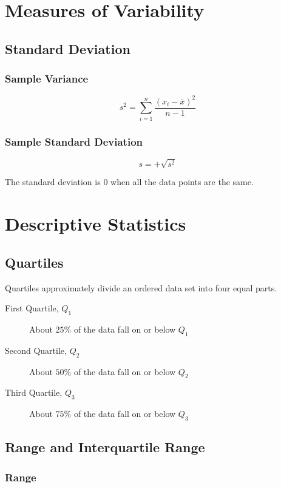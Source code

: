 \documentclass{book}
\begin{document}
\section{Measures of Variability}

\subsection{Standard Deviation}

\subsubsection{Sample Variance}

$$s^2 = \sum_{i=1}^n \frac{(x_i - \overline{x})^2}{n-1}$$

\subsubsection{Sample Standard Deviation}

$$s=+\sqrt{s^2}$$

The standard deviation is $0$ when all the data points are the same.

\section{Descriptive Statistics}

\subsection{Quartiles}

Quartiles approximately divide an ordered data set into four equal parts.

\begin{description}
\item[First Quartile, $Q_1$]
About $25\%$ of the data fall on or below $Q_1$
\item[Second Quartile, $Q_2$]
About $50\%$ of the data fall on or below $Q_2$
\item[Third Quartile, $Q_3$]
About $75\%$ of the data fall on or below $Q_3$
\end{description}

\subsection{Range and Interquartile Range}

\subsubsection{Range}
\end{document}
